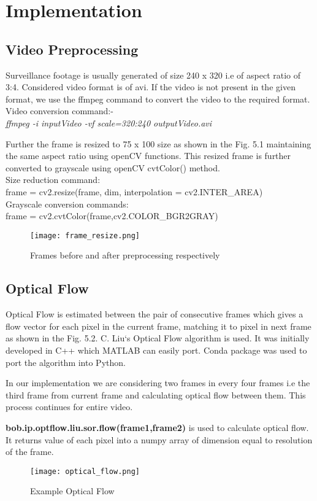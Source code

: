 \chapter{Implementation}
\section{Video Preprocessing}
Surveillance footage is usually generated of size 240 x 320 i.e of aspect ratio of 3:4. Considered video format is of avi. If the video is not present in the given format, we use the ffmpeg command to convert the video to the required format. 
\\
Video conversion command:-\\
\textit{ffmpeg -i {inputVideo} -vf scale=320:240 outputVideo.avi}
\par
Further the frame is resized to 75 x 100 size as shown in the Fig. 5.1 maintaining the same aspect ratio using openCV functions. This resized frame is further converted to grayscale using openCV cvtColor() method. \\
Size reduction command:\\
frame = cv2.resize(frame, dim, interpolation = cv2.INTER\_AREA)\\
Grayscale conversion commands: \\
frame = cv2.cvtColor(frame,cv2.COLOR\_BGR2GRAY)
\begin{center}
\begin{figure}[H]
\centering
\texttt{[image: frame\_resize.png]}
\caption{Frames before and after preprocessing respectively}
\end{figure}
\end{center}
\section{Optical Flow}
Optical Flow is estimated between the pair of consecutive frames which gives a flow vector for each pixel in the current frame, matching it to pixel in next frame as shown in the Fig. 5.2. C. Liu`s Optical Flow algorithm is used. It was initially developed in C++ which MATLAB can easily port. Conda package was used to port the algorithm into Python. \par
	In our implementation we are considering two frames in every four frames i.e the third frame from current frame and calculating optical flow between them. This process continues for entire video. \par \textbf{bob.ip.optflow.liu.sor.flow(frame1,frame2)} is used to calculate optical flow. It returns value of each pixel into a numpy array of dimension equal to resolution of the frame.
\begin{center}
\begin{figure}[H]
\centering
\texttt{[image: optical\_flow.png]}
\caption{Example Optical Flow}
\end{figure}
\end{center}

